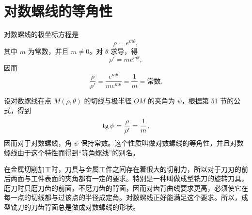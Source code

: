 \section{对数螺线的等角性}

对数螺线的极坐标方程是
\[
  \rho = e^{m\theta},
\]
其中 $m$ 为常数，并且 $m \neq 0$。对 $\theta$ 求导，得
\[
  \rho' = m e^{m\theta},
\]
因而
\[
  \frac{\rho}{\rho'} = \frac{e^{m\theta}}{m e^{m\theta}} = \frac{1}{m} = \text{常数}.
\]

设对数螺线在点 $M(\rho, \theta)$ 的切线与极半径 $OM$ 的夹角为 $\psi$，根据第 51 节的公式，得到
\[
  \operatorname{tg}\psi = \frac{\rho}{\rho'} = \frac{1}{m},
\]
因而对于对数螺线，角 $\psi$ 保持常数。这个性质叫做对数螺线的等角性，并且对数螺线由于这个特性而得到“等角螺线”的别名。

在金属切削加工时，刀具与金属工件之间存在着很大的切削力，所以对于刀刃的前后两面与工件表面的夹角都有一定的要求。特别是一种叫做成型铣刀的旋转刀具，磨刀时只磨刀齿的前面，不磨刀齿的背面，因而对齿背曲线要求更高，必须使它在每一点的切线都与过该点的半径成定角。对数螺线正好能满足这个要求。所以，成型铣刀的刀齿背面总是做成对数螺线的形状。
